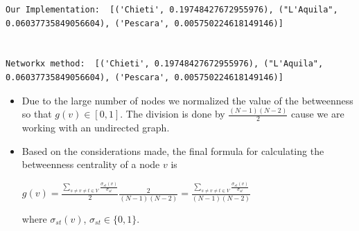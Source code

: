 \documentclass[11pt]{article}
\providecommand{\tightlist}{%
      \setlength{\itemsep}{0pt}\setlength{\parskip}{0pt}}
\begin{document}
    \begin{Verbatim}[commandchars=\\\{\}]
Our Implementation:  [('Chieti', 0.19748427672955976), ("L'Aquila",
0.06037735849056604), ('Pescara', 0.005750224618149146)]


Networkx method:  [('Chieti', 0.19748427672955976), ("L'Aquila",
0.06037735849056604), ('Pescara', 0.005750224618149146)]
    \end{Verbatim}

    \begin{itemize}
\tightlist
\item
  Due to the large number of nodes we normalized the value of the
  betweenness so that \(g(v)\in[0,1]\). The division is done by
  \(\frac{(N−1)(N−2)}{2}\) cause we are working with an undirected
  graph.
\end{itemize}

    \begin{itemize}
\tightlist
\item
  Based on the considerations made, the final formula for calculating
  the betweenness centrality of a node \(v\) is

  \(g(v) =\frac{\sum\limits_{s\neq v\neq t \in V} \frac{\sigma_{st}(v)}{\sigma_{st}}}{2}\frac{2}{(N-1)(N-2)} = \frac{\sum\limits_{s\neq v\neq t \in V} \frac{\sigma_{st}(v)}{\sigma_{st}}}{(N-1)(N-2)}\)

  where \(\sigma_{st}(v)\), \(\sigma_{st} \in \{0,1\}\).
\end{itemize}


\printbibliography[
heading=bibintoc,
title={Bibliography}]    
\end{document}
